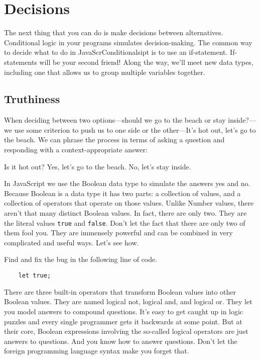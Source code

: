 \chapter[Second Friend: Decisions]{Decisions}

The next thing that you can do is make decisions between alternatives. Conditional logic in your programs simulates decision-making. The common way to decide what to do in JavaScrConditionalsipt is to use an if-statement. If-statements will be your second friend! Along the way, we'll meet new data types, including one that allows us to group multiple variables together.

\section{Truthiness}
When deciding between two options---should we go to the beach or stay inside?---we use some criterion to push us to one side or the other---It's hot out, let's go to the beach. We can phrase the process in terms of asking a question and responding with a context-appropriate answer:

Is it hot out?
Yes, let's go to the beach.
No, let's stay inside.

In JavaScript we use the \textsf{Boolean} data type to simulate the answers yes and no. Because \textsf{Boolean} is a data type it has two parts: a collection of values, and a collection of operators that operate on those values. Unlike \textsf{Number} values, there aren't that many distinct \textsf{Boolean} values. In fact, there are only two. They are the literal values \texttt{true} and \texttt{false}. Don't let the fact that there are only two of them fool you. They are immensely powerful and can be combined in very complicated and useful ways. Let's see how.

\begin{question}
  Find and fix the bug in the following line of code.
  \begin{lstlisting}
    let true;
  \end{lstlisting}
\end{question}

There are three built-in operators that transform \textsf{Boolean} values into other \textsf{Boolean} values. They are named logical \textsf{not}, logical \textsf{and}, and logical \textsf{or}. They let you model answers to compound questions. It's easy to get caught up in logic puzzles and every single programmer gets it backwards at some point. But at their core, \textsf{Boolean} expressions involving the so-called logical operators are just answers to questions. And you know how to answer questions. Don't let the foreign programming language syntax make you forget that.

